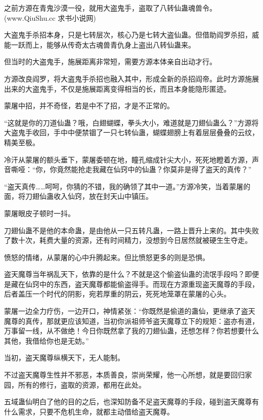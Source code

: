 
\begin{this_body}

之前方源在青鬼沙漠一役，就用大盗鬼手，盗取了八转仙蛊魂兽令。(www.QiuShu.cc 求书小说网)

大盗鬼手杀招本身，只是七转层次，核心乃是七转大盗仙蛊。但借助阎罗杀招，威能一跃而上，能够从传奇太古魂兽青仇身上盗出八转仙蛊来。

但当时的大盗鬼手，施展距离非常短，需要方源本体亲自出动才行。

方源改良阎罗，将大盗鬼手杀招也融入其中，形成全新的杀招阎帝。此时方源施展出来的大盗鬼手，不仅是施展距离变得相当的长，而且本身能隐形匿迹。

蒙屠中招，并不奇怪，若是中不了招，才是不正常的。

“这就是你的刀道仙蛊？哦，白翅蝴蝶，拳头大小，难道就是刀翅仙蛊么？”方源将大盗鬼手收回，手中中便禁锢了一只七转仙蛊，蝴蝶翅膀上有着层层叠叠的云纹，精美至极。

冷汗从蒙屠的额头垂下，蒙屠委顿在地，瞳孔缩成针尖大小，死死地瞪着方源，声音嘶哑：“你，你竟然能抢走我藏在仙窍中的仙蛊？你莫非是得了盗天的真传？”

“盗天真传……呵呵，你猜的不错，我的确领了其中一道。”方源冷笑，当着蒙屠的面，将刀翅仙蛊收入仙窍，放在封天山中镇压。

蒙屠眼皮子顿时一抖。

刀翅仙蛊不是他的本命蛊，是由他从一只五转凡蛊，一路上晋升上来的。其中失败了数十次，耗费大量的资源，还有时间精力，没想到今日居然就被硬生生夺走。

愤怒的情绪，从蒙屠的心中升腾起来。但比愤怒更多的则是恐惧。

盗天魔尊当年祸乱天下，依靠的是什么？不就是这个偷盗仙蛊的流氓手段吗？即便是藏在仙窍中的东西，盗天魔尊都能偷盗得手。而现在方源重现盗天魔尊的手段，后者盖压一个时代的阴影，宛若厚重的阴云，死死地笼罩在蒙屠的心头。

蒙屠一边全力疗伤，一边开口，神情紧张：“你既然是偷道的蛊仙，更继承了盗天魔尊的真传，那就更应该知道，当初你派祖师爷盗天魔尊立下的规矩：盗亦有道，万事留一线，从不做绝！今日你既然拿了我的刀翅仙蛊，还想怎样？你若想要什么其他，我借给你也是无妨。”

当初，盗天魔尊纵横天下，无人能制。

不过盗天魔尊生性并不邪恶，本质善良，崇尚荣耀，他一心所想，就是要回归家园，所有的修行，盗取的资源，都用在此处。

五域蛊仙明白了他的目的之后，也深知防备不足盗天魔尊的手段，碰到盗天魔尊有什么需求，只要不危机生命，就都主动借给盗天魔尊。


\end{this_body}

